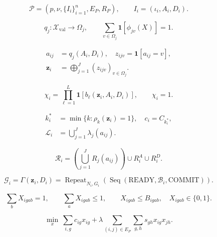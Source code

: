 \begin{equation}
\mathcal{P}=(p,\nu,\{I_i\}_{i=1}^{n},E_P,R_P),\qquad I_i=(\iota_i,A_i,D_i).
\label{eq:rx}
\end{equation}

\begin{equation}
q_j:\mathcal{X}_{\mathrm{val}}\to\Omega_j,\qquad \sum_{v\in\Omega_j}\mathbf{1}[\phi_{jv}(X)]=1.
\label{eq:total}
\end{equation}

\begin{equation}
\begin{aligned}a_{ij}&=q_j(A_i,D_i),\quad z_{ijv}=\mathbf{1}[a_{ij}=v],\\\mathbf z_i&=\bigoplus_{j=1}^{J}(z_{ijv})_{v\in\Omega_j}.\end{aligned}
\label{eq:encode}
\end{equation}

\begin{equation}
\chi_i=\prod_{\ell=1}^{L}\mathbf{1}[b_{\ell}(\mathbf z_i,A_i,D_i)],\qquad \chi_i=1.
\label{eq:check}
\end{equation}

\begin{equation}
\begin{aligned}k_i^*&=\min\{k:\rho_k(\mathbf z_i)=1\},\quad c_i=C_{k_i^*},\\\mathcal L_i&=\bigcup_{j=1}^{J}\lambda_j(a_{ij}).\end{aligned}
\label{eq:class}
\end{equation}

\begin{equation}
\mathcal R_i=\left(\bigcup_{j=1}^{J}R_j(a_{ij})\right)\cup R_i^A\cup R_i^D.
\label{eq:req}
\end{equation}

\begin{equation}
\mathcal G_i=\Gamma(\mathbf z_i,D_i)=\operatorname{Repeat}_{N_i,G_i}\!\left(\operatorname{Seq}(\mathrm{READY},\mathcal B_i,\mathrm{COMMIT})\right).
\label{eq:graph}
\end{equation}

\begin{equation}
\sum_b X_{igab}=1,\qquad \sum_a X_{igab}\leq1,\qquad X_{igab}\leq B_{igab},\quad X_{igab}\in\{0,1\}.
\label{eq:bind}
\end{equation}

\begin{equation}
\min_{x}\ \sum_{i,g}c_{ig}x_{ig}+\lambda\!\sum_{(i,j)\in E_P}\sum_{g,h}s_{gh}x_{ig}x_{jh}.
\label{eq:assign}
\end{equation}

